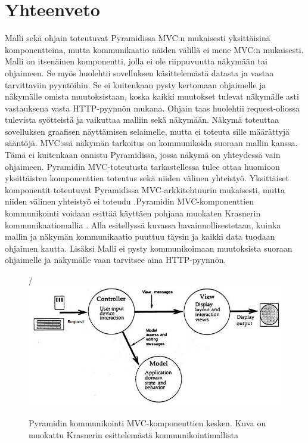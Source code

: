 \documentclass[utf8]{gradu3}
\begin{document}
\section{Yhteenveto}
Malli sekä ohjain toteutuvat Pyramidissa MVC:n mukaisesti yksittäisinä komponentteina, mutta kommunikaatio näiden välillä ei mene MVC:n mukaisesti. Malli on itsenäinen komponentti, jolla ei ole riippuvuutta näkymään tai ohjaimeen. Se myös huolehtii sovelluksen käsittelemästä datasta ja vastaa tarvittaviin pyyntöihin. Se ei kuitenkaan pysty kertomaan ohjaimelle ja näkymälle omista muutoksistaan, koska kaikki muutokset tulevat näkymälle asti vastauksena vasta HTTP-pyynnön mukana. Ohjain taas huolehtii request-oliossa tulevista syötteistä ja vaikuttaa malliin sekä näkymään. Näkymä toteuttaa sovelluksen graafisen näyttämisen selaimelle, mutta ei toteuta sille määrättyjä sääntöjä. MVC:ssä näkymän tarkoitus on kommunikoida suoraan mallin kanssa. Tämä ei kuitenkaan onnistu Pyramidissa, jossa näkymä on yhteydessä vain ohjaimeen. Pyramidin MVC-toteutusta tarkastellessa tulee ottaa huomioon yksittäisten komponenttien toteutus sekä niiden välinen yhteistyö. Yksittäiset komponentit toteutuvat Pyramidissa MVC-arkkitehtuurin mukaisesti, mutta niiden välinen yhteistyö ei toteudu .Pyramidin MVC-komponenttien kommunikointi voidaan esittää käyttäen pohjana muokaten Krasnerin kommunikaatiomallia \cite{krasner_desc}.
Alla esitellyssä kuvassa havainnollisestetaan, kuinka mallin ja näkymän kommunikaatio puuttuu täysin ja kaikki data tuodaan ohjaimen kautta. Lisäksi Malli ei pysty kommunikoimaan muutoksista suoraan ohjaimelle ja näkymälle vaan tarvitsee aina HTTP-pyynnön.

\begin{figure}[h]
\centering/
\includegraphics[scale=0.85]{pyramid_mvc.jpg}
\caption{Pyramidin kommunikointi MVC-komponenttien kesken. Kuva on muokattu Krasnerin esittelemästä kommunikointimallista \cite{krasner_desc} }
\end{figure}
\end{document}
